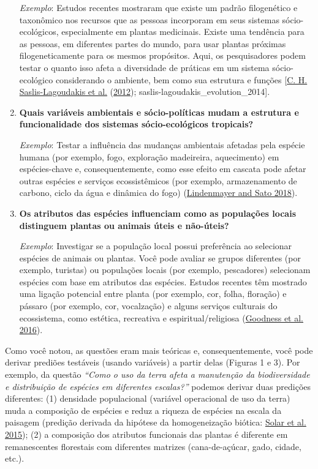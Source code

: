\documentclass[
]{article}
\begin{document}
\begin{enumerate}
  \emph{Exemplo}: Estudos recentes mostraram que existe um padrão filogenético e taxonômico nos recursos que as pessoas incorporam em seus sistemas sócio-ecológicos, especialmente em plantas medicinais. Existe uma tendência para as pessoas, em diferentes partes do mundo, para usar plantas próximas filogeneticamente para os mesmos propósitos. Aqui, os pesquisadores podem testar o quanto isso afeta a diversidade de práticas em um sistema sócio-ecológico considerando o ambiente, bem como sua estrutura e funções {[}\protect\hyperlink{ref-saslis-lagoudakis_phylogenies_2012}{C. H. Saslis-Lagoudakis et al.} (\protect\hyperlink{ref-saslis-lagoudakis_phylogenies_2012}{2012}); saslis-lagoudakis\_evolution\_2014{]}.
\item
  \textbf{Quais variáveis ambientais e sócio-políticas mudam a estrutura e funcionalidade dos sistemas sócio-ecológicos tropicais?}

  \emph{Exemplo}: Testar a influência das mudanças ambientais afetadas pela espécie humana (por exemplo, fogo, exploração madeireira, aquecimento) em espécies-chave e, consequentemente, como esse efeito em cascata pode afetar outras espécies e serviços ecossistêmicos (por exemplo, armazenamento de carbono, ciclo da água e dinâmica do fogo) (\protect\hyperlink{ref-lindenmayer_hidden_2018}{Lindenmayer and Sato 2018}).
\item
  \textbf{Os atributos das espécies influenciam como as populações locais distinguem plantas ou animais úteis e não-úteis?}

  \emph{Exemplo}: Investigar se a população local possui preferência ao selecionar espécies de animais ou plantas. Você pode avaliar se grupos diferentes (por exemplo, turistas) ou populações locais (por exemplo, pescadores) selecionam espécies com base em atributos das espécies. Estudos recentes têm mostrado uma ligação potencial entre planta (por exemplo, cor, folha, floração) e pássaro (por exemplo, cor, vocalzação) e alguns serviços culturais do ecossistema, como estética, recreativa e espiritual/religiosa (\protect\hyperlink{ref-goodness_exploring_2016}{Goodness et al. 2016}).
\end{enumerate}

Como você notou, as questões eram mais teóricas e, consequentemente, você pode derivar prediões testáveis (usando variáveis) a partir delas (Figuras 1 e 3). Por exemplo, da questão \emph{``Como o uso da terra afeta a manutenção da biodiversidade e distribuição de espécies em diferentes escalas?''} podemos derivar duas predições diferentes: (1) densidade populacional (variável operacional de uso da terra) muda a composição de espécies e reduz a riqueza de espécies na escala da paisagem (predição derivada da hipótese da homogeneização biótica: \protect\hyperlink{ref-solar_how_2015}{Solar et al. 2015}); (2) a composição dos atributos funcionais das plantas é diferente em remanescentes florestais com diferentes matrizes (cana-de-açúcar, gado, cidade, etc.).
\end{document}
